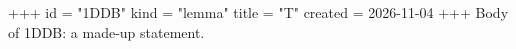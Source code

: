 +++
id = "1DDB"
kind = "lemma"
title = "T"
created = 2026-11-04
+++
Body of 1DDB: a made-up statement.
